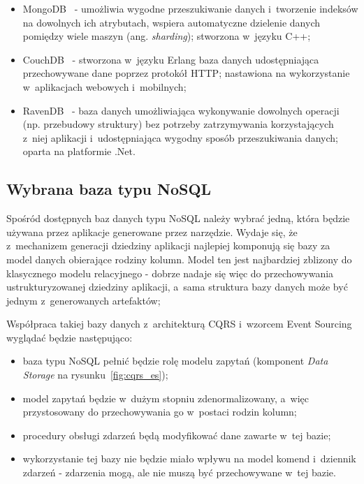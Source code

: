 \begin{itemize}
 \item MongoDB~\cite{mongo_db} - umożliwia wygodne przeszukiwanie danych i~tworzenie indeksów na dowolnych ich atrybutach, wspiera automatyczne dzielenie danych pomiędzy wiele maszyn (ang. \emph{sharding}); stworzona w~języku C++;
 \item CouchDB~\cite{couch_db} - stworzona w~języku Erlang baza danych udostępniająca przechowywane dane poprzez protokół HTTP; nastawiona na wykorzystanie w~aplikacjach webowych i~mobilnych;
 \item RavenDB~\cite{raven_db} - baza danych umożliwiająca wykonywanie dowolnych operacji (np. przebudowy struktury) bez potrzeby zatrzymywania korzystających z~niej aplikacji i~udostępniająca wygodny sposób przeszukiwania danych; oparta na platformie .Net.
\end{itemize}


\subsection{Wybrana baza typu NoSQL}

Spośród dostępnych baz danych typu NoSQL należy wybrać jedną, która będzie używana przez aplikacje generowane przez narzędzie.
Wydaje się, że z~mechanizem generacji dziedziny aplikacji najlepiej komponują się bazy za model danych obierające rodziny kolumn.
Model ten jest najbardziej zblizony do klasycznego modelu relacyjnego - dobrze nadaje się więc do przechowywania ustrukturyzowanej dziedziny aplikacji, a~sama struktura bazy danych może być jednym z~generowanych artefaktów;

Współpraca takiej bazy danych z~architekturą CQRS i~wzorcem Event Sourcing wyglądać będzie następująco:

\begin{itemize}
 \item baza typu NoSQL pełnić będzie rolę modelu zapytań (komponent \emph{Data Storage} na rysunku~\ref{fig:cqrs_es});
 \item model zapytań będzie w~dużym stopniu zdenormalizowany, a~więc przystosowany do przechowywania go w~postaci rodzin kolumn;
 \item procedury obsługi zdarzeń będą modyfikować dane zawarte w~tej bazie;
 \item wykorzystanie tej bazy nie będzie miało wpływu na model komend i~dziennik zdarzeń - zdarzenia mogą, ale nie muszą być przechowywane w~tej bazie.
\end{itemize}

